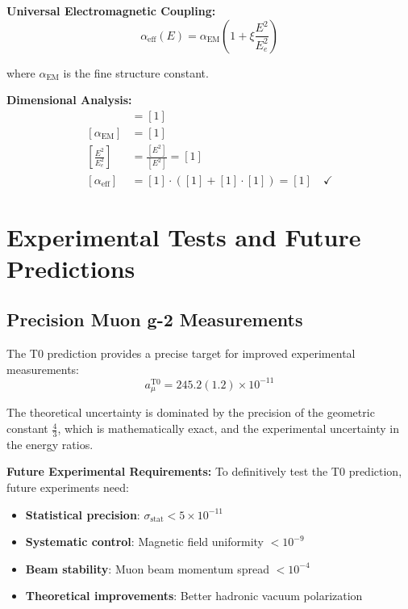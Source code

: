\documentclass[12pt,a4paper]{report}
\begin{document}
\textbf{Universal Electromagnetic Coupling:}
\begin{equation}
	\alpha_{\text{eff}}(E) = \alpha_{\text{EM}} \left(1 + \xi \frac{E^2}{E_e^2}\right)
\end{equation}

where $\alpha_{\text{EM}}$ is the fine structure constant.

\textbf{Dimensional Analysis:}
\begin{align}
	[\alpha_{\text{eff}}] &= [1] \\
	[\alpha_{\text{EM}}] &= [1] \\
	\left[\frac{E^2}{E_e^2}\right] &= \frac{[E^2]}{[E^2]} = [1] \\
	[\alpha_{\text{eff}}] &= [1] \cdot ([1] + [1] \cdot [1]) = [1] \quad \checkmark
\end{align}

\section{Experimental Tests and Future Predictions}
\label{sec:experimental_tests}

\subsection{Precision Muon g-2 Measurements}
\label{subsec:precision_muon_measurements}

The T0 prediction provides a precise target for improved experimental measurements:
\begin{equation}
	a_\mu^{\text{T0}} = 245.2(1.2) \times 10^{-11}
\end{equation}

The theoretical uncertainty is dominated by the precision of the geometric constant $\frac{4}{3}$, which is mathematically exact, and the experimental uncertainty in the energy ratios.

\textbf{Future Experimental Requirements:}
To definitively test the T0 prediction, future experiments need:
\begin{itemize}
	\item \textbf{Statistical precision}: $\sigma_{\text{stat}} < 5 \times 10^{-11}$
	\item \textbf{Systematic control}: Magnetic field uniformity $< 10^{-9}$
	\item \textbf{Beam stability}: Muon beam momentum spread $< 10^{-4}$
	\item \textbf{Theoretical improvements}: Better hadronic vacuum polarization
\end{itemize}
\end{document}
